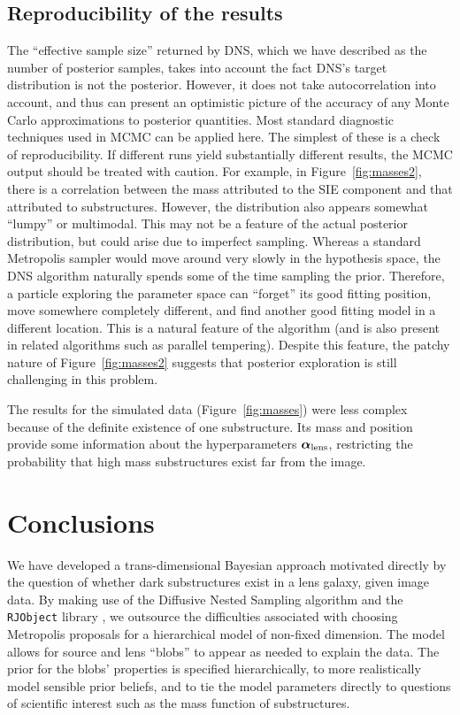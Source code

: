 \documentclass[useAMS,usenatbib]{mn2e}
\begin{document}
\subsection{Reproducibility of the results}\label{sec:convergence}
The ``effective sample size'' returned by DNS, which we have described as the
number of posterior samples, takes into account the fact DNS's target
distribution is not the posterior. However, it does not take autocorrelation
into account, and thus can present an optimistic picture of the accuracy of
any Monte Carlo approximations to posterior quantities. Most standard diagnostic
techniques used in MCMC can be applied here. The simplest of these is a
check of reproducibility. If different runs yield substantially different
results, the MCMC output should be treated with caution. For example, in
Figure~\ref{fig:masses2}, there is a correlation between the mass attributed
to the SIE component and that attributed to substructures. However, the
distribution also appears somewhat ``lumpy'' or multimodal. This may
not be a feature of the actual posterior distribution, but could arise due to
imperfect sampling. Whereas a standard Metropolis sampler would move around
very slowly in the hypothesis space, the DNS algorithm naturally spends some
of the time sampling the prior. Therefore, a particle exploring the parameter
space can ``forget'' its good fitting position, move somewhere completely
different, and find another good fitting model in a different location. This
is a natural feature of the algorithm (and is also present in related
algorithms such as parallel tempering). Despite this feature, the patchy
nature of Figure~\ref{fig:masses2} suggests that posterior exploration is
still challenging in this problem.

The results for the simulated data (Figure~\ref{fig:masses})
were less complex because of the definite existence of one substructure.
Its mass and position provide some information about the hyperparameters
$\boldsymbol{\alpha}_{\rm lens}$, restricting the probability that
high mass substructures exist far from the image.

\section{Conclusions}
We have developed a trans-dimensional Bayesian approach motivated directly by
the question of whether dark substructures exist in a lens galaxy, given image
data. By making use of the Diffusive Nested Sampling algorithm \citep{dnest}
and the {\tt RJObject} library \citep{rjobject}, we outsource the difficulties
associated with choosing Metropolis proposals for a hierarchical model of
non-fixed dimension. The model allows for source and lens ``blobs'' to appear
as needed to explain the data. The prior for the blobs' properties is
specified hierarchically, to more realistically model sensible prior beliefs,
and to tie the model parameters directly to questions of scientific interest
such as the mass function of substructures.
\end{document}
